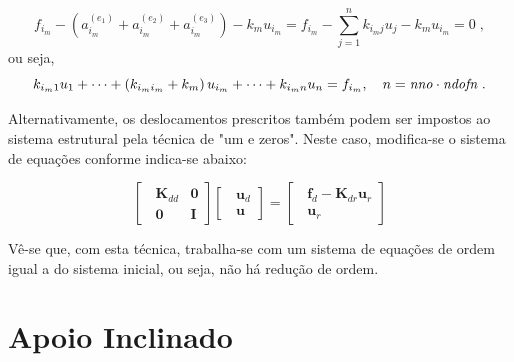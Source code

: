 \[f_{i_m}-\left( a_{i_m}^{(e_1)} + a_{i_m}^{(e_2)} + a_{i_m}^{(e_3)} \right) - k_m u_{i_m} = f_{i_m} - \sum_{j=1}^{n}k_{i_mj}u_j - k_m u_{i_m}=0  \; ,\]
\noindent ou seja,
\[k_{i_m1}u_1+\cdots +\left( k_{{i_m}{i_m}}+k_m \right)u_{i_m}+\cdots + k_{i_m n}u_n=f_{i_m}, \quad n=\textrm{\textit{nno}}\cdot \textrm{\textit{ndofn}} \;.\]

Alternativamente, os deslocamentos prescritos também podem ser impostos ao sistema estrutural pela técnica de "um e zeros". Neste caso, modifica-se o sistema de equações conforme indica-se abaixo:

\begin{equation} \label{seq_10s}
	\left[\;\; \begin{matrix}
			\mathbf{K}_{dd} & \mathbf{0} \\
			\mathbf{0}      & \mathbf{I}
		\end{matrix} \right]
	\left[ \;\;\begin{matrix}
			\mathbf{u}_{d} \\
			\mathbf{u}
		\end{matrix} \right] =
	\left[\;\; \begin{matrix}
			\mathbf{f}_{d}-\mathbf{K}_{dr}\mathbf{u}_{r} \\
			\mathbf{u}_{r}
		\end{matrix} \right] \end{equation}

Vê-se que, com esta técnica, trabalha-se com um sistema de equações de ordem igual a do sistema inicial, ou seja, não há redução de ordem.

\section{Apoio Inclinado}

